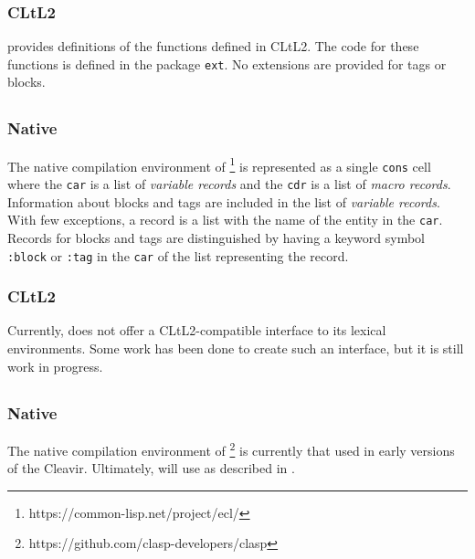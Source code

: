 \subsubsection{CLtL2}

\cmucl{} provides definitions of the functions defined in CLtL2.  The
code for these functions is defined in the package \texttt{ext}.  No
extensions are provided for tags or blocks.

\subsection{\ecl{}}

\subsubsection{Native}

The native compilation environment of \ecl{}%
\footnote{https://common-lisp.net/project/ecl/}
is represented as a single \texttt{cons} cell where the \texttt{car}
is a list of \emph{variable records} and the \texttt{cdr} is a list of
\emph{macro records}.  Information about blocks and tags are included
in the list of \emph{variable records}.  With few exceptions, a record
is a list with the name of the entity in the \texttt{car}.  Records
for blocks and tags are distinguished by having a keyword symbol
\texttt{:block} or \texttt{:tag} in the \texttt{car} of the list
representing the record.

\subsubsection{CLtL2}

Currently, \ecl{} does not offer a CLtL2-compatible interface to its
lexical environments.  Some work has been done to create such an
interface, but it is still work in progress.

\subsection{\clasp{}}

\subsubsection{Native}

The native compilation environment of \clasp{}%
\footnote{https://github.com/clasp-developers/clasp}
is currently that used in early versions of the Cleavir.  Ultimately,
\clasp{} will use \trucler{} as described in .


